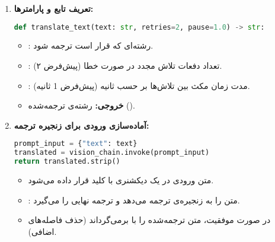 \documentclass{article}
\begin{document}
\begin{enumerate}
    \item \textbf{تعریف تابع و پارامترها:}
    \begin{latin}
    \begin{lstlisting}[language=Python]
def translate_text(text: str, retries=2, pause=1.0) -> str:
    \end{lstlisting}
    \end{latin}
    \begin{itemize}
        \item {}: رشته‌ای که قرار است ترجمه شود.
        \item {}: تعداد دفعات تلاش مجدد در صورت خطا (پیش‌فرض ۲).
        \item {}: مدت زمان مکث بین تلاش‌ها بر حسب ثانیه (پیش‌فرض 1 ثانیه).
        \item \textbf{خروجی:} رشته‌ی ترجمه‌شده ().
    \end{itemize}

    \item \textbf{آماده‌سازی ورودی برای زنجیره ترجمه:}
    \begin{latin}
    \begin{lstlisting}[language=Python]
prompt_input = {"text": text}
translated = vision_chain.invoke(prompt_input)
return translated.strip()
    \end{lstlisting}
    \end{latin}
    \begin{itemize}
        \item متن ورودی در یک دیکشنری با کلید  قرار داده می‌شود.
        \item {}: متن را به زنجیره‌ی ترجمه می‌دهد و ترجمه نهایی را می‌گیرد.
        \item در صورت موفقیت، متن ترجمه‌شده را با  برمی‌گرداند (حذف فاصله‌های اضافی).
    \end{itemize}


\end{enumerate}
\end{document}
